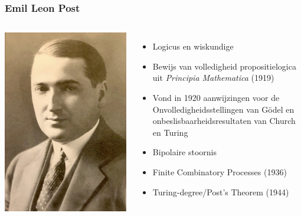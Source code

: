\documentclass{beamer}
\begin{document}
\begin{frame}{}
    \frametitle{Emil Leon Post}
    \begin{columns}
        \includegraphics[height=0.8\textheight]{Post.jpg}
        {\small
        \begin{itemize}
            \item<2-> Logicus en wiskundige
            \item<3-> Bewijs van volledigheid propositielogica uit \emph{Principia Mathematica} (1919) 
            \item<4-> Vond in 1920 aanwijzingen voor de Onvolledigheidsstellingen van Gödel 
            en onbeslisbaarheidsresultaten van Church en Turing
            \item<5-> Bipolaire stoornis
            \item<6-> Finite Combinatory Processes (1936)
            \item<7-> Turing-degree/Post's Theorem (1944)
        \end{itemize}
        }
    \end{columns}        
\end{frame}
\end{document}
